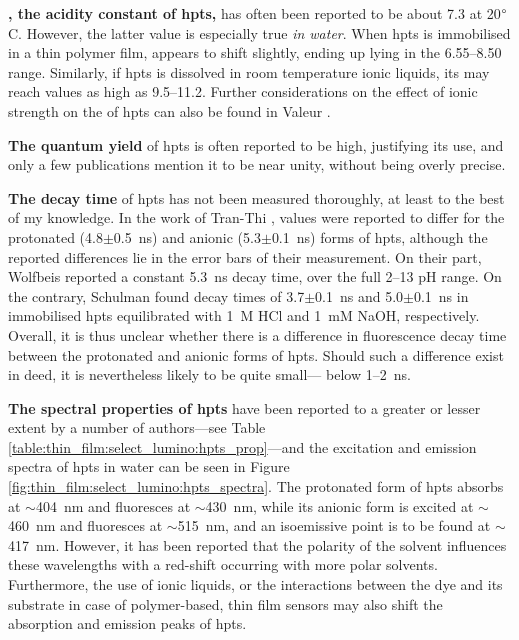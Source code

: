 \textbf{\pKa, the acidity constant of \gls{hpts},} has often been reported to be about 7.3 at 20$\degree$C. However, the latter value is especially true \emph{in water}. When \gls{hpts} is immobilised in a thin polymer film, \pKa{} appears to shift slightly, ending up lying in the 6.55--8.50 range\cite{schulman1995, hakonen2008}. Similarly, if \gls{hpts} is dissolved in room temperature ionic liquids, its \pKa{} may reach values as high as 9.5--11.2\cite{oter2006}. Further considerations on the effect of ionic strength on the \pKa{} of \gls{hpts} can also be found in Valeur \etal{}\cite[p.~414]{valeur2012molecfluo}.

\textbf{The quantum yield} of \gls{hpts} is often reported to be high, justifying its use, and only a few publications mention it to be near unity, without being overly precise\cite{schulman1995, tranthi2002, kumar2018}.

\textbf{The decay time} of \gls{hpts} has not been measured thoroughly, at least to the best of my knowledge. In the work of Tran-Thi \etal{}\cite{tranthi2002}, values were reported to differ for the protonated (4.8$\pm$0.5~ns) and anionic (5.3$\pm$0.1~ns) forms of \gls{hpts}, although the reported differences lie in the error bars of their measurement. On their part, Wolfbeis \etal{}\cite{wolfbeis1983} reported a constant 5.3~ns decay time, over the full 2--13 pH range. On the contrary, Schulman \etal{}\cite{schulman1995} found decay times of 3.7$\pm$0.1~ns and 5.0$\pm$0.1~ns in immobilised \gls{hpts} equilibrated with 1~M HCl and 1~mM NaOH, respectively. Overall, it is thus unclear whether there is a difference in fluorescence decay time between the protonated and anionic forms of \gls{hpts}. Should such a difference exist in deed, it is nevertheless likely to be quite small---\ie{} below 1--2~ns. %

\textbf{The spectral properties of \gls{hpts}} have been reported to a greater or lesser extent by a number of authors---see Table \ref{table:thin_film:select_lumino:hpts_prop}---and the excitation and emission spectra of \gls{hpts} in water can be seen in Figure \ref{fig:thin_film:select_lumino:hpts_spectra}. The protonated form of \gls{hpts} absorbs at $\sim$404~nm and fluoresces at $\sim$430~nm, while its anionic form is excited at $\sim$460~nm and fluoresces at $\sim$515~nm, and an isoemissive point is to be found at $\sim$417~nm\cite{uttamlal1995, oter2008}. However, it has been reported that the polarity of the solvent influences these wavelengths with a red-shift occurring with more polar solvents\cite{barrash1998, tranthi2002}. Furthermore, the use of ionic liquids\cite{oter2006, oter2008}, or the interactions between the dye and its substrate in case of polymer-based, thin film sensors\cite{malins1998, chu2008, chu2009} may also shift the absorption and emission peaks of \gls{hpts}.


